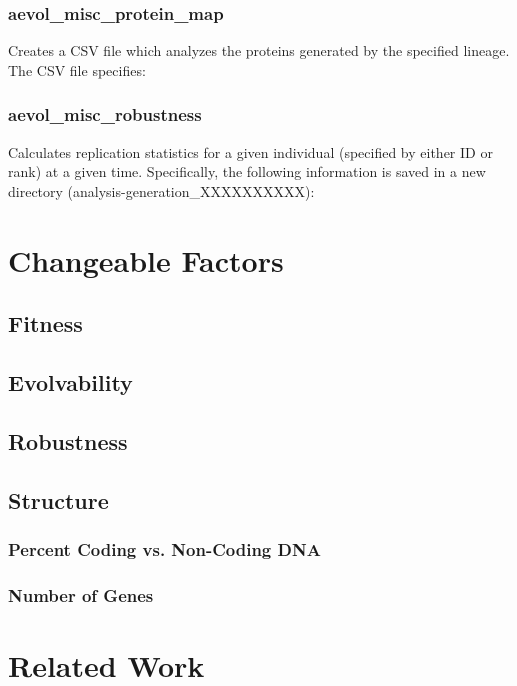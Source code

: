 \subsubsection{aevol\_misc\_protein\_map}

Creates a CSV file which analyzes the proteins generated by the specified lineage. The CSV file specifies:



\subsubsection{aevol\_misc\_robustness}

Calculates replication statistics for a given individual (specified by either ID or rank) at a given time.  Specifically, the following information is saved in a new directory (analysis-generation\_XXXXXXXXXX):


\section{Changeable Factors}
\subsection{Fitness}
\subsection{Evolvability}
\subsection{Robustness}
\subsection{Structure}
\subsubsection{Percent Coding vs. Non-Coding DNA}
\subsubsection{Number of Genes}


\section{Related Work}\label{related_work}
